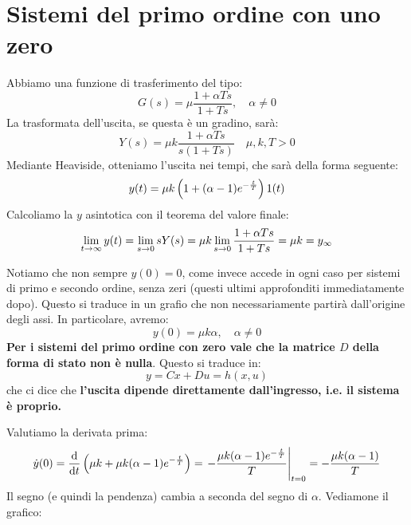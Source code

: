 \section{Sistemi del primo ordine con uno zero}
Abbiamo una funzione di trasferimento del tipo:
\begin{equation}
G(s) =\mu \frac{1+\alpha Ts }{1+Ts}, \quad \alpha \neq 0
\end{equation}
La trasformata dell'uscita, se questa è un gradino, sarà:
\begin{equation*}
Y(s) = \mu k \frac{1+\alpha Ts}{s(1+Ts)} \quad \mu, k, T > 0
\end{equation*}
Mediante Heaviside, otteniamo l'uscita nei tempi, che sarà della forma seguente:
\begin{equation}
y(t) = \mu k \left( 1+(\alpha -1)e^{-\frac{t}{T}} \right)1(t)
\end{equation}
Calcoliamo la $y$ asintotica con il teorema del valore finale:
\begin{equation}
\lim_{t \rightarrow \infty} y(t) = \lim_{s \rightarrow 0} sY(s) = \mu k \lim_{s \rightarrow 0} \frac{1+\alpha Ts}{1+Ts} = \mu k = y_\infty
\end{equation}
\begin{defin}{}{}
Notiamo che non sempre $y(0) = 0$, come invece accede in ogni caso per sistemi di primo e secondo ordine, senza zeri (questi ultimi approfonditi immediatamente dopo). Questo si traduce in un grafio che non necessariamente partirà dall'origine degli assi. In particolare, avremo:
\begin{equation}
y(0) = \mu k \alpha, \quad \alpha \neq 0
\end{equation}
\textbf{Per i sistemi del primo ordine con zero vale che la matrice $D$ della forma di stato non è nulla}. Questo si traduce in:
\begin{equation*}
y = Cx+Du = h(x,u)
\end{equation*}
che ci dice che \textbf{l'uscita dipende direttamente dall'ingresso, i.e. il sistema è proprio.}
\end{defin}
Valutiamo la derivata prima:
\begin{equation*}
\dot y(0) = \dv{t}  \paren{\mu k +\mu k (\alpha -1)e^{-\frac{t}{T}}} = \eval{-\frac{\mu k(\alpha - 1) e^{-\frac{t}{T}}}{T}}_{t=0} = -\frac{\mu k (\alpha -1) }{T}
\end{equation*}
Il segno (e quindi la pendenza) cambia a seconda del segno di $\alpha$. Vediamone il grafico:


